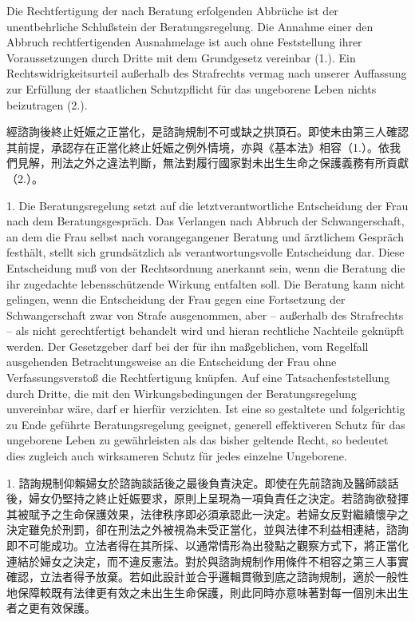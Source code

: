 \documentclass[12pt]{article}
\begin{document}
\begin{sourcepara}[title={原文SondervotumMS.292}]
Die Rechtfertigung der nach Beratung erfolgenden Abbrüche ist der unentbehrliche Schlußstein der Beratungsregelung. Die Annahme einer den Abbruch rechtfertigenden Ausnahmelage ist auch ohne Feststellung ihrer Voraussetzungen durch Dritte mit dem Grundgesetz vereinbar (1.). Ein Rechtswidrigkeitsurteil außerhalb des Strafrechts vermag nach unserer Auffassung zur Erfüllung der staatlichen Schutzpflicht für das ungeborene Leben nichts beizutragen (2.).
\end{sourcepara}
\begin{transpara}
經諮詢後終止妊娠之正當化，是諮詢規制不可或缺之拱頂石。即使未由第三人確認其前提，承認存在正當化終止妊娠之例外情境，亦與《基本法》相容（1.）。依我們見解，刑法之外之違法判斷，無法對履行國家對未出生生命之保護義務有所貢獻（2.）。
\end{transpara}

\begin{sourcepara}[title={原文SondervotumMS.293}]
1. Die Beratungsregelung setzt auf die letztverantwortliche Entscheidung der Frau nach dem Beratungsgespräch. Das Verlangen nach Abbruch der Schwangerschaft, an dem die Frau selbst nach vorangegangener Beratung und ärztlichem Gespräch festhält, stellt sich grundsätzlich als verantwortungsvolle Entscheidung dar. Diese Entscheidung muß von der Rechtsordnung anerkannt sein, wenn die Beratung die ihr zugedachte lebensschützende Wirkung entfalten soll. Die Beratung kann nicht gelingen, wenn die Entscheidung der Frau gegen eine Fortsetzung der Schwangerschaft zwar von Strafe ausgenommen, aber -- außerhalb des Strafrechts -- als nicht gerechtfertigt behandelt wird und hieran rechtliche Nachteile geknüpft werden. Der Gesetzgeber darf bei der für ihn maßgeblichen, vom Regelfall ausgehenden Betrachtungsweise an die Entscheidung der Frau ohne Verfassungsverstoß die Rechtfertigung knüpfen. Auf eine Tatsachenfeststellung durch Dritte, die mit den Wirkungsbedingungen der Beratungsregelung unvereinbar wäre, darf er hierfür verzichten. Ist eine so gestaltete und folgerichtig zu Ende geführte Beratungsregelung geeignet, generell effektiveren Schutz für das ungeborene Leben zu gewährleisten als das bisher geltende Recht, so bedeutet dies zugleich auch wirksameren Schutz für jedes einzelne Ungeborene.
\end{sourcepara}
\begin{transpara}
1. 諮詢規制仰賴婦女於諮詢談話後之最後負責決定。即使在先前諮詢及醫師談話後，婦女仍堅持之終止妊娠要求，原則上呈現為一項負責任之決定。若諮詢欲發揮其被賦予之生命保護效果，法律秩序即必須承認此一決定。若婦女反對繼續懷孕之決定雖免於刑罰，卻在刑法之外被視為未受正當化，並與法律不利益相連結，諮詢即不可能成功。立法者得在其所採、以通常情形為出發點之觀察方式下，將正當化連結於婦女之決定，而不違反憲法。對於與諮詢規制作用條件不相容之第三人事實確認，立法者得予放棄。若如此設計並合乎邏輯貫徹到底之諮詢規制，適於一般性地保障較既有法律更有效之未出生生命保護，則此同時亦意味著對每一個別未出生者之更有效保護。
\end{transpara}
\end{document}

